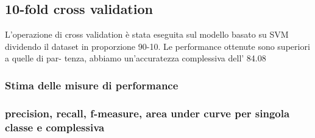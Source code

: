 \subsection{10-fold cross validation}
L’operazione di cross validation è stata eseguita sul modello basato su SVM 
dividendo il dataset in proporzione 90-10. Le performance ottenute sono 
superiori a quelle di par- tenza, abbiamo un’accuratezza complessiva dell’ 
84.08%




\subsubsection{Stima delle misure di performance}

\subsubsection{precision, recall, f-measure, area under curve per singola 
	classe e 
	complessiva}
